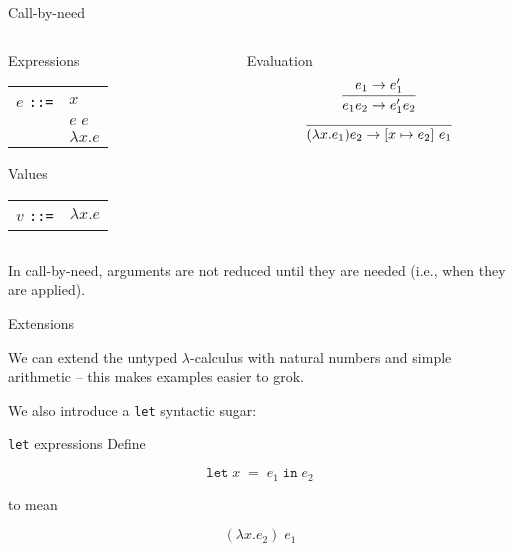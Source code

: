 %
\begin{frame}{Call-by-need}

\begin{columns}
\begin{column}{0.4\textwidth}

\begin{block}{Expressions}
\begin{tabular}{ll}
$e$ \texttt{::=} & $x$              \\
                 & $e \; e$         \\
                 & $\lambda x . e$  \\
\end{tabular}
\end{block}

\begin{block}{Values}
\begin{tabular}{ll}
$v$ \texttt{::=} & $\lambda x . e$  \\
\end{tabular}
\end{block}

\end{column}
\begin{column}{0.4\textwidth}

\begin{block}{Evaluation}
\[
\infer{e_1 e_2 \to e_1' e_2}{e_1 \to e_1'}
\]
\[
\infer{(\lambda x . e_1) e_2 \to \left[x \mapsto e_2 \right] \, e_1}{}
\]
\end{block}

\end{column}
\end{columns}

In call-by-need, arguments are not reduced until they are needed (i.e., when
they are applied).

\end{frame}

%
\begin{frame}{Extensions}

We can extend the untyped $\lambda$-calculus with natural numbers and simple
arithmetic -- this makes examples easier to grok.

We also introduce a \texttt{let} syntactic sugar:

\begin{block}{\texttt{let} expressions}
Define

\[
\mathtt{let} \; x \; \mathtt{=} \; e_1 \; \mathtt{in} \; e_2
\]

to mean

\[
(\lambda x . e_2) \; e_1
\]
\end{block}

\end{frame}

